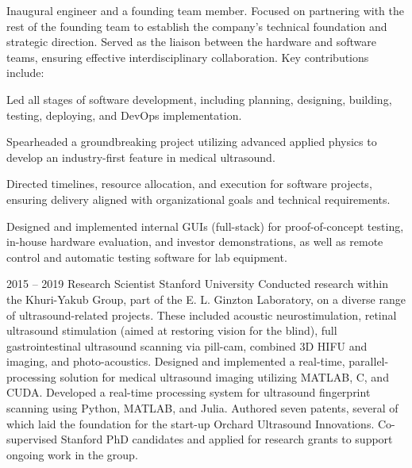 \documentclass[8pt]{mofiicv}
\begin{document}
\begin{minipage}[T]{\SecondColumnWidth}
\begin{entrylist}
{			Inaugural engineer and a founding team member. Focused on partnering with the rest of the founding team to establish the company's technical foundation and strategic direction. Served as the liaison between the hardware and software teams, ensuring effective interdisciplinary collaboration. 
			Key contributions include:
			\begin{description}[noitemsep,font=\normalfont\itshape]
				\item[Software Development Leadership] Led all stages of software development, including planning, designing, building, testing, deploying, and DevOps implementation.
				\item[Nonlinear Signal Processing] Spearheaded a groundbreaking project utilizing advanced applied physics to develop an industry-first feature in medical ultrasound. 
				\item[Strategic Project Management]  Directed timelines, resource allocation, and execution for software projects, ensuring delivery aligned with organizational goals and technical requirements.
				\item[Innovative Software Solutions] Designed and implemented internal GUIs (full-stack) for proof-of-concept testing, in-house hardware evaluation, and investor demonstrations, as well as remote control and automatic testing software for lab equipment.
			\end{description}\vspace*{-0.9em}
			}
		\entry
			{2015 -- 2019}
			{Research Scientist}
			{Stanford University}
			{
			Conducted research within the Khuri-Yakub Group, part of the E. L. Ginzton Laboratory, on a diverse range of ultrasound-related projects. These included acoustic neurostimulation, retinal ultrasound stimulation (aimed at restoring vision for the blind), full gastrointestinal ultrasound scanning via pill-cam, combined 3D HIFU and imaging, and photo-acoustics. Designed and implemented a real-time, parallel-processing solution for medical ultrasound imaging utilizing MATLAB, C, and CUDA. Developed a real-time processing system for ultrasound fingerprint scanning using Python, MATLAB, and Julia. Authored seven patents, several of which laid the foundation for the start-up Orchard Ultrasound Innovations. Co-supervised Stanford PhD candidates and applied for research grants to support ongoing work in the group.\\ 
			}
		\entry

\end{entrylist}
\end{minipage}
\end{document}
